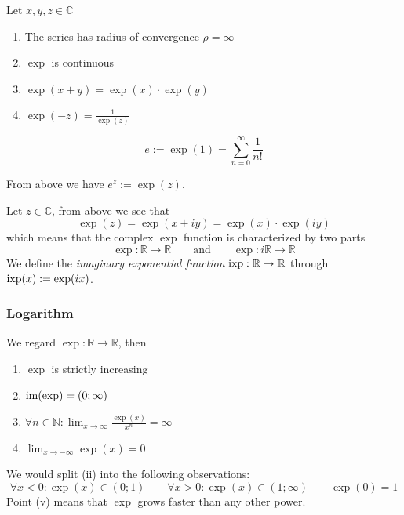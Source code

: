 \begin{proposition}[Properties]
   Let \(x, y, z \in \mathbb{C}\)
   \begin{enumerate}[label=\roman*, align=Center]
      \item The series has radius of convergence \(\rho = \infty\)
      \item \(\exp\) is continuous
      \item \(\exp(x + y) = \exp(x) \cdot \exp(y)\)
      \item \(\exp(-z) = \frac{1}{\exp(z)}\)
   \end{enumerate}
\end{proposition}

\begin{definition}
   \[e := \exp(1) = \sum_{n=0}^\infty \frac{1}{n!}\]
\end{definition}
\begin{remark}[Notation]
   From above we have \(e^z := \exp(z)\).
\end{remark}

Let \(z \in \mathbb{C}\), from above we see that
\[\exp(z) = \exp(x + iy) = \exp(x) \cdot \exp(iy)\]
which means that the complex \(\exp\) function is characterized by two parts
\[\exp: \mathbb{R} \to \mathbb{R} \qquad\text{and}\qquad \exp: i\mathbb{R} \to \mathbb{R}\]
We define the \emph{imaginary exponential function} \(\operatorname{ixp}: \mathbb{R} \to \mathbb{R}\) through \(\operatorname{ixp}(x) := \exp(ix)\).

\subsubsection{Logarithm}
\begin{proposition}
   We regard \(\exp: \mathbb{R} \to \mathbb{R}\), then
   \begin{enumerate}[label=\roman*, align=Center]
      \item \(\exp\) is strictly increasing
      \item \(\operatorname{im}(\exp) = (0; \infty)\)
      \item \(\forall n \in \mathbb{N}: \lim_{x \to \infty} \frac{\exp(x)}{x^n} = \infty\)
      \item \(\lim_{x \to -\infty} \exp(x) = 0\)
   \end{enumerate}
\end{proposition}
\begin{remark}[Intuition]
   We would split (ii) into the following observations:
   \[\forall x < 0: \exp(x) \in (0; 1) \qquad \forall x > 0: \exp(x) \in (1; \infty) \qquad \exp(0) = 1\]
   Point (v) means that \(\exp\) grows faster than any other power.
\end{remark}

